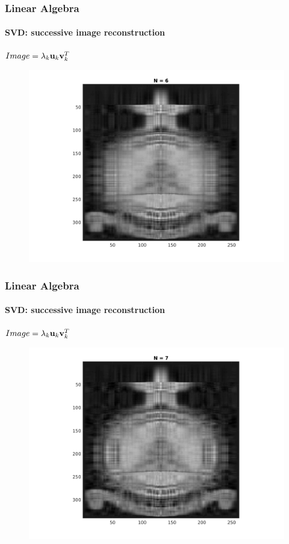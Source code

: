 \documentclass[hyperref={pdfpagelabels=true}]{beamer}
\begin{document}
\begin{frame}
\frametitle{Linear Algebra}
\framesubtitle{SVD: successive image reconstruction} 
\small{
\begin{center}
$Image = \lambda_k{\bf u}_k {\bf v}_k^T$
\end{center}}
\begin{figure}[!htb]
\centering
\includegraphics [scale=0.48]{n/b6.png}
\end{figure}
\end{frame}

\begin{frame}
\frametitle{Linear Algebra}
\framesubtitle{SVD: successive image reconstruction} 
\small{
\begin{center}
$Image = \lambda_k{\bf u}_k {\bf v}_k^T$
\end{center}}
\begin{figure}[!htb]
\centering
\includegraphics [scale=0.48]{n/b7.png}
\end{figure}
\end{frame}
\end{document}
